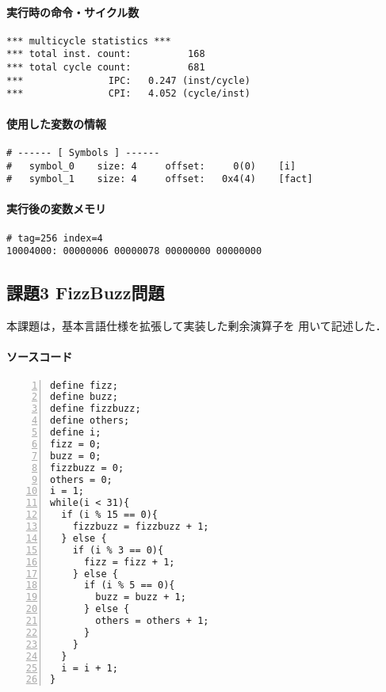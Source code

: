 \paragraph*{実行時の命令・サイクル数}
\begin{Verbatim}[numbers=none, frame=single,
fontsize=\small, baselinestretch=0.8]
*** multicycle statistics ***
*** total inst. count:          168
*** total cycle count:          681
***               IPC:   0.247 (inst/cycle)
***               CPI:   4.052 (cycle/inst)
\end{Verbatim}

\paragraph*{使用した変数の情報}
\begin{Verbatim}[numbers=none, frame=single,
  fontsize=\small, baselinestretch=0.8]
# ------ [ Symbols ] ------
# 	symbol_0 	size: 4 	offset:     0(0) 	[i]
# 	symbol_1 	size: 4 	offset:   0x4(4) 	[fact]  
\end{Verbatim}

\paragraph*{実行後の変数メモリ}
\begin{Verbatim}[numbers=none, frame=single,
  fontsize=\small, baselinestretch=0.8]
# tag=256 index=4
10004000: 00000006 00000078 00000000 00000000
\end{Verbatim}

\subsection{課題3 FizzBuzz問題}
本課題は，基本言語仕様を拡張して実装した剰余演算子を
用いて記述した．

\paragraph*{ソースコード}
\begin{Verbatim}[numbers=left, xleftmargin=10mm, numbersep=6pt, frame=single,
  fontsize=\small, baselinestretch=0.8]
define fizz;
define buzz;
define fizzbuzz;
define others;
define i;
fizz = 0;
buzz = 0;
fizzbuzz = 0;
others = 0;
i = 1;
while(i < 31){
  if (i % 15 == 0){
    fizzbuzz = fizzbuzz + 1;
  } else {
    if (i % 3 == 0){
      fizz = fizz + 1;
    } else {
      if (i % 5 == 0){
        buzz = buzz + 1;
      } else {
        others = others + 1;
      }
    }
  }
  i = i + 1;
}  
\end{Verbatim}


